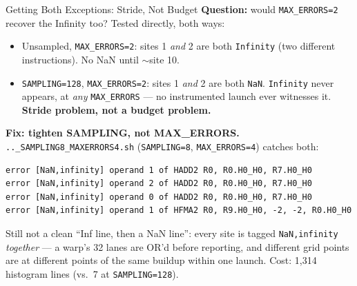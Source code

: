 \documentclass{beamer}
\begin{document}
\begin{frame}[fragile]{Getting Both Exceptions: Stride, Not Budget}
\textbf{Question:} would \texttt{MAX\_ERRORS=2} recover the Infinity too?
Tested directly, both ways:
\begin{itemize}
  \item Unsampled, \texttt{MAX\_ERRORS=2}: sites 1 \emph{and} 2 are both
    \texttt{Infinity} (two different instructions). No NaN until
    ${\sim}$site 10.
  \item \texttt{SAMPLING=128}, \texttt{MAX\_ERRORS=2}: sites 1 \emph{and}
    2 are both \texttt{NaN}. \texttt{Infinity} never appears, at
    \emph{any} \texttt{MAX\_ERRORS} --- no instrumented launch ever
    witnesses it. \textbf{Stride problem, not a budget problem.}
\end{itemize}

\textbf{Fix: tighten SAMPLING, not MAX\_ERRORS.}
\texttt{..\_SAMPLING8\_MAXERRORS4.sh} (\texttt{SAMPLING=8},
\texttt{MAX\_ERRORS=4}) catches both:
\begin{lstlisting}[basicstyle=\ttfamily\tiny]
error [NaN,infinity] operand 1 of HADD2 R0, R0.H0_H0, R7.H0_H0
error [NaN,infinity] operand 2 of HADD2 R0, R0.H0_H0, R7.H0_H0
error [NaN,infinity] operand 0 of HADD2 R0, R0.H0_H0, R7.H0_H0
error [NaN,infinity] operand 1 of HFMA2 R0, R9.H0_H0, -2, -2, R0.H0_H0
\end{lstlisting}
{\small Still not a clean ``Inf line, then a NaN line'': every site is
tagged \texttt{NaN,infinity} \emph{together} --- a warp's 32 lanes are
OR'd before reporting, and different grid points are at different points
of the same buildup within one launch. Cost: 1{,}314 histogram lines
(vs.\ 7 at \texttt{SAMPLING=128}).}
\end{frame}
\end{document}
